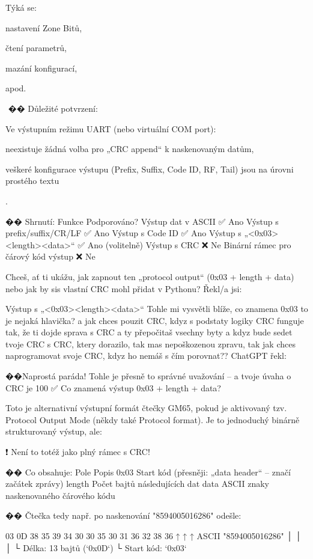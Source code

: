 Týká se:

    nastavení Zone Bitů,

    čtení parametrů,

    mazání konfigurací,

    apod.​

​
�� Důležité potvrzení:

    Ve výstupním režimu UART (nebo virtuální COM port):

        neexistuje žádná volba pro „CRC append“ k naskenovaným datům,

        veškeré konfigurace výstupu (Prefix, Suffix, Code ID, RF, Tail) jsou na úrovni prostého textu​

        .

�� Shrnutí:
Funkce	Podporováno?
Výstup dat v ASCII	✅ Ano
Výstup s prefix/suffix/CR/LF	✅ Ano
Výstup s Code ID	✅ Ano
Výstup s „<0x03><length><data>“	✅ Ano (volitelně)
Výstup s CRC	❌ Ne
Binární rámec pro čárový kód výstup	❌ Ne

Chceš, ať ti ukážu, jak zapnout ten „protocol output“ (0x03 + length + data) nebo jak by sis vlastní CRC mohl přidat v Pythonu?
Řekl/a jsi:

Výstup s „<0x03><length><data>“
Tohle mi vysvětli blíže, co znamena 0x03 to je nejaká hlavička? a jak chces pouzit CRC, kdyz s podstaty logiky CRC funguje tak, že ti dojde sprava s CRC a ty přepočitaš vsechny byty a kdyz bude sedet tvoje CRC s CRC, ktery dorazilo, tak mas nepoškozenou zpravu, tak jak chces naprogramovat svoje CRC, kdyz ho nemáš s čím porovnat??
ChatGPT řekl:

��Naprostá paráda! Tohle je přesně to správné uvažování – a tvoje úvaha o CRC je 100%
✅ Co znamená výstup 0x03 + length + data?

Toto je alternativní výstupní formát čtečky GM65, pokud je aktivovaný tzv. Protocol Output Mode (někdy také Protocol format).
Je to jednoduchý binárně strukturovaný výstup, ale:

    ❗ Není to totéž jako plný rámec s CRC!

�� Co obsahuje:
Pole	Popis
0x03	Start kód (přesněji: „data header“ – značí začátek zprávy)
length	Počet bajtů následujících dat
data	ASCII znaky naskenovaného čárového kódu

�� Čtečka tedy např. po naskenování "8594005016286" odešle:

03 0D 38 35 39 34 30 30 35 30 31 36 32 38 36
↑  ↑  ↑ ASCII "8594005016286"
│  │
│  └ Délka: 13 bajtů (`0x0D`)
└ Start kód: `0x03`

